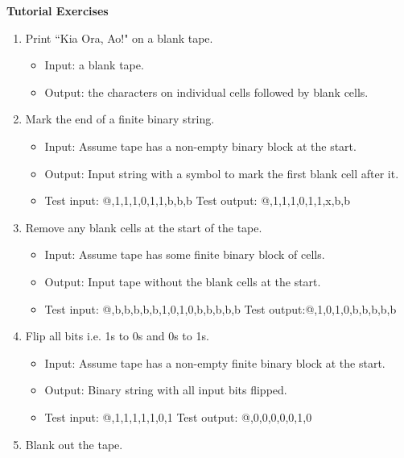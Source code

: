 \documentclass[11pt]{report}
\begin{document}
\newpage
{\bf Tutorial Exercises}
\begin{enumerate}
	
	\item Print ``Kia Ora, Ao!" on a blank tape. 
	
		\begin{itemize}
			\item[] Input: a blank tape. 
			\item[] Output: the characters on individual cells followed by blank cells. 
		\end{itemize}
	
	\item Mark the end of a finite binary string.
	
		\begin{itemize}
			\item[] Input: Assume tape has a non-empty binary block at the start.
			\item[] Output: Input string with a symbol to mark the first blank cell after it. 
			\item[] Test input: @,1,1,1,0,1,1,b,b,b Test output: @,1,1,1,0,1,1,x,b,b
		\end{itemize}

	\item Remove any blank cells at the start of the tape. 
	
		\begin{itemize}
			\item[] Input: Assume tape has some finite binary block of cells. 
			\item[] Output: Input tape without the blank cells at the start. 
			\item[] Test input: @,b,b,b,b,b,1,0,1,0,b,b,b,b,b Test output:@,1,0,1,0,b,b,b,b,b
		\end{itemize}
	
	\item Flip all bits i.e. 1s to 0s and 0s to 1s.  
	
		\begin{itemize}
			\item[] Input: Assume tape has a non-empty finite binary block at the start. 
			\item[] Output: Binary string with all input bits flipped. 
			\item[] Test input: @,1,1,1,1,1,0,1 Test output: @,0,0,0,0,0,1,0
		\end{itemize}

	\item Blank out the tape. 
	

\end{enumerate}
\end{document}
